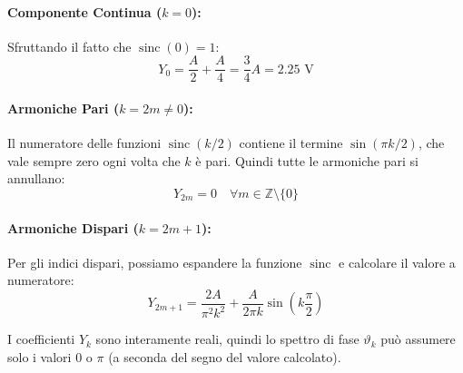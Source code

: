 \paragraph{Componente Continua ($k=0$):}
Sfruttando il fatto che $\operatorname{sinc}(0) = 1$:
\[ Y_0 = \frac{A}{2} + \frac{A}{4} = \frac{3}{4} A = 2.25 \text{ V} \]

\paragraph{Armoniche Pari ($k = 2m \neq 0$):}
Il numeratore delle funzioni $\operatorname{sinc}(k/2)$ contiene il termine $\sin(\pi k / 2)$, che vale sempre zero ogni volta che $k$ è pari. Quindi tutte le armoniche pari si annullano:
\[ Y_{2m} = 0 \quad \forall m \in \mathbb{Z} \setminus \{0\} \]

\paragraph{Armoniche Dispari ($k = 2m + 1$):}
Per gli indici dispari, possiamo espandere la funzione $\operatorname{sinc}$ e calcolare il valore a numeratore:
\begin{equation}
    Y_{2m+1} = \frac{2A}{\pi^2 k^2} + \frac{A}{2 \pi k} \sin\left(k \frac{\pi}{2}\right)
\end{equation}

\vspace{0.5cm}
I coefficienti $Y_k$ sono interamente reali, quindi lo spettro di fase $\vartheta_k$ può assumere solo i valori $0$ o $\pi$ (a seconda del segno del valore calcolato).
